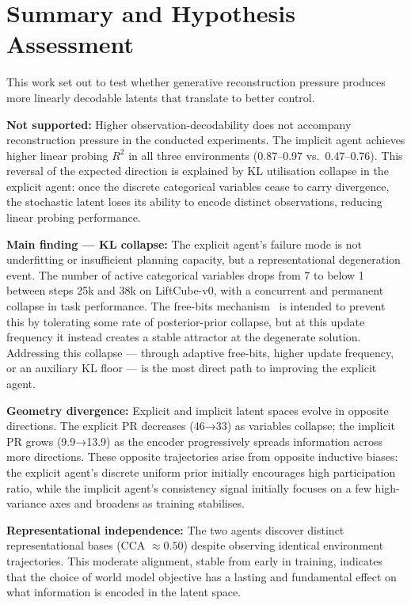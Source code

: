 \documentclass{article}
\begin{document}
\section{Summary and Hypothesis Assessment}
\label{sec:summary}

This work set out to test whether generative reconstruction pressure produces more
linearly decodable latents that translate to better control.

\textbf{Not supported:} Higher observation-decodability does not accompany
reconstruction pressure in the conducted experiments.
The implicit agent achieves higher linear probing $R^2$ in all three environments
(0.87--0.97 vs.\ 0.47--0.76).
This reversal of the expected direction is explained by KL utilisation collapse in
the explicit agent: once the discrete categorical variables cease to carry divergence,
the stochastic latent loses its ability to encode distinct observations, reducing linear
probing performance.

\textbf{Main finding — KL collapse:} The explicit agent's failure mode is not
underfitting or insufficient planning capacity, but a representational degeneration
event.
The number of active categorical variables drops from 7 to below 1 between steps 25k
and 38k on LiftCube-v0, with a concurrent and permanent collapse in task performance.
The free-bits mechanism~\citep{hafner2023dreamerv3} is intended to prevent this by
tolerating some rate of posterior-prior collapse, but at this update frequency it
instead creates a stable attractor at the degenerate solution.
Addressing this collapse — through adaptive free-bits, higher update frequency, or
an auxiliary KL floor — is the most direct path to improving the explicit agent.

\textbf{Geometry divergence:} Explicit and implicit latent spaces evolve in opposite
directions.
The explicit PR decreases (46→33) as variables collapse; the implicit PR grows
(9.9→13.9) as the encoder progressively spreads information across more directions.
These opposite trajectories arise from opposite inductive biases: the explicit agent's
discrete uniform prior initially encourages high participation ratio, while the implicit
agent's consistency signal initially focuses on a few high-variance axes and broadens
as training stabilises.

\textbf{Representational independence:} The two agents discover distinct representational
bases (CCA $\approx 0.50$) despite observing identical environment trajectories.
This moderate alignment, stable from early in training, indicates that the choice of
world model objective has a lasting and fundamental effect on what information is
encoded in the latent space.
\end{document}
